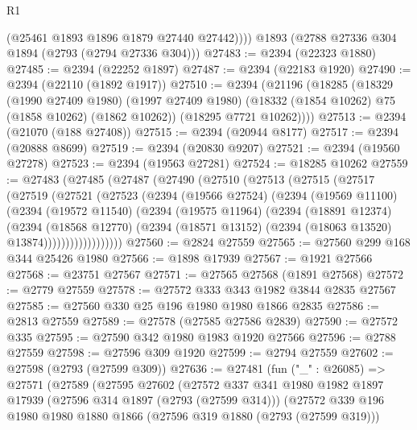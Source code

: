\begin{lexlean}{R1}
\begin{coremodule}
          (@25461 @1893 @1896 @1879 @27440 @27442))))
    @1893
    (@2788 @27336 @304 @1894 (@2793 (@2794 @27336 @304)))
@27483 := @2394 (@22323 @1880)
@27485 := @2394 (@22252 @1897)
@27487 := @2394 (@22183 @1920)
@27490 := @2394 (@22110 (@1892 @1917))
@27510 := @2394
    (@21196
      (@18285
        (@18329
          (@1990 @27409 @1980)
          (@1997 @27409 @1980)
          (@18332 (@1854 @10262) @75 (@1858 @10262) (@1862 @10262))
          (@18295 @7721 @10262))))
@27513 := @2394 (@21070 (@188 @27408))
@27515 := @2394 (@20944 @8177)
@27517 := @2394 (@20888 @8699)
@27519 := @2394 (@20830 @9207)
@27521 := @2394 (@19560 @27278)
@27523 := @2394 (@19563 @27281)
@27524 := @18285 @10262
@27559 := @27483
    (@27485
      (@27487
        (@27490
          (@27510
            (@27513
              (@27515
                (@27517
                  (@27519
                    (@27521
                      (@27523
                        (@2394
                          (@19566 @27524)
                          (@2394
                            (@19569 @11100)
                            (@2394
                              (@19572 @11540)
                              (@2394
                                (@19575 @11964)
                                (@2394
                                  (@18891 @12374)
                                  (@2394
                                    (@18568 @12770)
                                    (@2394
                                      (@18571 @13152)
                                      (@2394 (@18063 @13520) @13874))))))))))))))))))
@27560 := @2824 @27559
@27565 := @27560 @299 @168 @344 @25426 @1980
@27566 := @1898 @17939
@27567 := @1921 @27566
@27568 := @23751 @27567
@27571 := @27565 @27568 (@1891 @27568)
@27572 := @2779 @27559
@27578 := @27572 @333 @343 @1982 @3844 @2835 @27567
@27585 := @27560 @330 @25 @196 @1980 @1980 @1866 @2835
@27586 := @2813 @27559
@27589 := @27578 (@27585 @27586 @2839)
@27590 := @27572 @335
@27595 := @27590 @342 @1980 @1983 @1920 @27566
@27596 := @2788 @27559
@27598 := @27596 @309 @1920
@27599 := @2794 @27559
@27602 := @27598 (@2793 (@27599 @309))
@27636 := @27481
    (fun ("_" : @26085) =>
    @27571
      (@27589
        (@27595
          @27602
          (@27572
            @337
            @341
            @1980
            @1982
            @1897
            @17939
            (@27596 @314 @1897 (@2793 (@27599 @314)))
            (@27572
              @339
              @196
              @1980
              @1980
              @1880
              @1866
              (@27596 @319 @1880 (@2793 (@27599 @319)))

\end{coremodule}
\end{lexlean}
